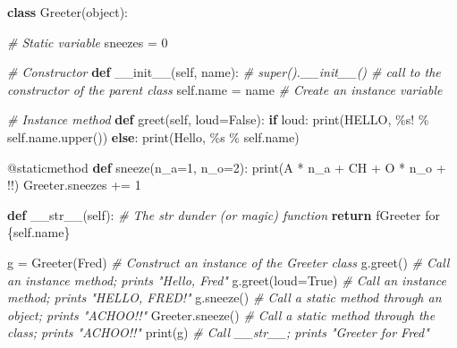 \documentclass[
]{article}
\newenvironment{Shaded}{}{}
\newcommand{\AttributeTok}[1]{\textcolor[rgb]{0.49,0.56,0.16}{#1}}
\newcommand{\BuiltInTok}[1]{#1}
\newcommand{\CommentTok}[1]{\textcolor[rgb]{0.38,0.63,0.69}{\textit{#1}}}
\newcommand{\ControlFlowTok}[1]{\textcolor[rgb]{0.00,0.44,0.13}{\textbf{#1}}}
\newcommand{\DecValTok}[1]{\textcolor[rgb]{0.25,0.63,0.44}{#1}}
\newcommand{\FunctionTok}[1]{\textcolor[rgb]{0.02,0.16,0.49}{#1}}
\newcommand{\KeywordTok}[1]{\textcolor[rgb]{0.00,0.44,0.13}{\textbf{#1}}}
\newcommand{\NormalTok}[1]{#1}
\newcommand{\OperatorTok}[1]{\textcolor[rgb]{0.40,0.40,0.40}{#1}}
\newcommand{\SpecialCharTok}[1]{\textcolor[rgb]{0.25,0.44,0.63}{#1}}
\newcommand{\SpecialStringTok}[1]{\textcolor[rgb]{0.73,0.40,0.53}{#1}}
\newcommand{\StringTok}[1]{\textcolor[rgb]{0.25,0.44,0.63}{#1}}
\newcommand{\VariableTok}[1]{\textcolor[rgb]{0.10,0.09,0.49}{#1}}
\begin{document}
\begin{Shaded}
\begin{Highlighting}[]
\KeywordTok{class}\NormalTok{ Greeter(}\BuiltInTok{object}\NormalTok{):}
    
    \CommentTok{\# Static variable}
\NormalTok{    sneezes }\OperatorTok{=} \DecValTok{0}

    \CommentTok{\# Constructor}
    \KeywordTok{def} \FunctionTok{\_\_init\_\_}\NormalTok{(}\VariableTok{self}\NormalTok{, name):}
        \CommentTok{\# super().\_\_init\_\_()  \# call to the constructor of the parent class}
        \VariableTok{self}\NormalTok{.name }\OperatorTok{=}\NormalTok{ name  }\CommentTok{\# Create an instance variable}

    \CommentTok{\# Instance method}
    \KeywordTok{def}\NormalTok{ greet(}\VariableTok{self}\NormalTok{, loud}\OperatorTok{=}\VariableTok{False}\NormalTok{):}
        \ControlFlowTok{if}\NormalTok{ loud:}
            \BuiltInTok{print}\NormalTok{(}\StringTok{\textquotesingle{}HELLO, }\SpecialCharTok{\%s}\StringTok{!\textquotesingle{}} \OperatorTok{\%} \VariableTok{self}\NormalTok{.name.upper())}
        \ControlFlowTok{else}\NormalTok{:}
            \BuiltInTok{print}\NormalTok{(}\StringTok{\textquotesingle{}Hello, }\SpecialCharTok{\%s}\StringTok{\textquotesingle{}} \OperatorTok{\%} \VariableTok{self}\NormalTok{.name)}

    \AttributeTok{@staticmethod}
    \KeywordTok{def}\NormalTok{ sneeze(n\_a}\OperatorTok{=}\DecValTok{1}\NormalTok{, n\_o}\OperatorTok{=}\DecValTok{2}\NormalTok{):}
        \BuiltInTok{print}\NormalTok{(}\StringTok{\textquotesingle{}A\textquotesingle{}} \OperatorTok{*}\NormalTok{ n\_a }\OperatorTok{+} \StringTok{\textquotesingle{}CH\textquotesingle{}} \OperatorTok{+} \StringTok{\textquotesingle{}O\textquotesingle{}} \OperatorTok{*}\NormalTok{ n\_o }\OperatorTok{+} \StringTok{\textquotesingle{}!!\textquotesingle{}}\NormalTok{)}
\NormalTok{        Greeter.sneezes }\OperatorTok{+=} \DecValTok{1}
        
    \KeywordTok{def} \FunctionTok{\_\_str\_\_}\NormalTok{(}\VariableTok{self}\NormalTok{):  }\CommentTok{\# The str dunder (or magic) function}
        \ControlFlowTok{return} \SpecialStringTok{f\textquotesingle{}Greeter for }\SpecialCharTok{\{}\VariableTok{self}\SpecialCharTok{.}\NormalTok{name}\SpecialCharTok{\}}\SpecialStringTok{\textquotesingle{}}

\NormalTok{g }\OperatorTok{=}\NormalTok{ Greeter(}\StringTok{\textquotesingle{}Fred\textquotesingle{}}\NormalTok{)  }\CommentTok{\# Construct an instance of the Greeter class}
\NormalTok{g.greet()            }\CommentTok{\# Call an instance method; prints "Hello, Fred"}
\NormalTok{g.greet(loud}\OperatorTok{=}\VariableTok{True}\NormalTok{)   }\CommentTok{\# Call an instance method; prints "HELLO, FRED!"}
\NormalTok{g.sneeze()           }\CommentTok{\# Call a static method through an object; prints "ACHOO!!"}
\NormalTok{Greeter.sneeze()     }\CommentTok{\# Call a static method through the class; prints "ACHOO!!"}
\BuiltInTok{print}\NormalTok{(g)             }\CommentTok{\# Call \_\_str\_\_; prints "Greeter for Fred"}
\end{Highlighting}
\end{Shaded}
\end{document}
